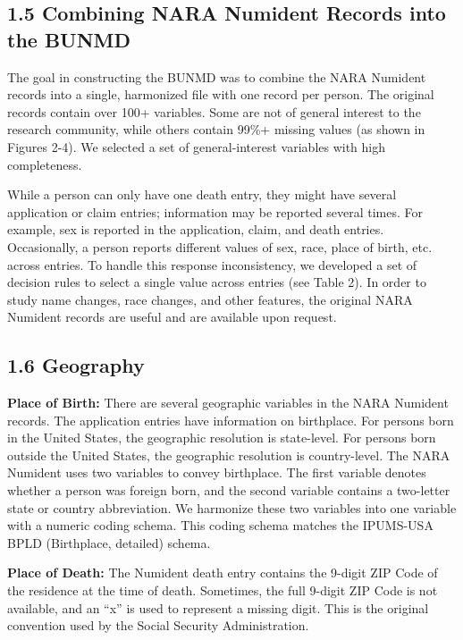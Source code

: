 \documentclass[
  11pt,
]{article}
\begin{document}
\hypertarget{combining-nara-numident-records-into-the-bunmd}{%
\subsection{1.5 Combining NARA Numident Records into the
BUNMD}\label{combining-nara-numident-records-into-the-bunmd}}

The goal in constructing the BUNMD was to combine the NARA Numident
records into a single, harmonized file with one record per person. The
original records contain over 100+ variables. Some are not of general
interest to the research community, while others contain 99\%+ missing
values (as shown in Figures 2-4). We selected a set of general-interest
variables with high completeness.

While a person can only have one death entry, they might have several
application or claim entries; information may be reported several times.
For example, sex is reported in the application, claim, and death
entries. Occasionally, a person reports different values of sex, race,
place of birth, etc. across entries. To handle this response
inconsistency, we developed a set of decision rules to select a single
value across entries (see Table 2). In order to study name changes, race
changes, and other features, the original NARA Numident records are
useful and are available upon request.

\hypertarget{geography-1}{%
\subsection{1.6 Geography}\label{geography-1}}

\textbf{Place of Birth:} There are several geographic variables in the
NARA Numident records. The application entries have information on
birthplace. For persons born in the United States, the geographic
resolution is state-level. For persons born outside the United States,
the geographic resolution is country-level. The NARA Numident uses two
variables to convey birthplace. The first variable denotes whether a
person was foreign born, and the second variable contains a two-letter
state or country abbreviation. We harmonize these two variables into one
variable with a numeric coding schema. This coding schema matches the
IPUMS-USA BPLD (Birthplace, detailed) schema.

\textbf{Place of Death:} The Numident death entry contains the 9-digit
ZIP Code of the residence at the time of death. Sometimes, the full
9-digit ZIP Code is not available, and an ``x'' is used to represent a
missing digit. This is the original convention used by the Social
Security Administration.
\end{document}
